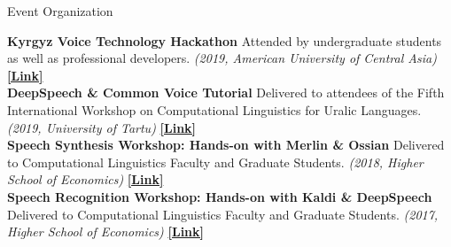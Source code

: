 \documentclass{resume} %
\begin{document}
\begin{minipage}{\textwidth}
\begin{rSection}{Event Organization}
\vspace{.25cm}

{\bf Kyrgyz Voice Technology Hackathon} {Attended by undergraduate students as well as professional developers.} {\em (2019, American University of Central Asia)} \hfill {\href{https://jrmeyer.github.io/kyrgyz-voice-hackathon/}{\textbf{[Link]}}} \\

{\bf DeepSpeech \& Common Voice Tutorial} {Delivered to attendees of the Fifth International Workshop on Computational Linguistics for Uralic Languages.} {\em (2019, University of Tartu)} \hfill { \href{https://sisu.ut.ee/iwclul2019/avaleht}{\textbf{[Link]}}} \\

{\bf Speech Synthesis Workshop: Hands-on with Merlin \& Ossian} {Delivered to Computational Linguistics Faculty and Graduate Students.} {\em (2018, Higher School of Economics)} \hfill {\href{http://jrmeyer.github.io/tts/2016/12/09/tts-workshop.html}{\textbf{[Link]}}} \\

{\bf Speech Recognition Workshop: Hands-on with Kaldi \& DeepSpeech} {Delivered to Computational Linguistics Faculty and Graduate Students.} {\em (2017, Higher School of Economics)} \hfill {\href{http://jrmeyer.github.io/misc/stt-vishka.pdf}{\textbf{[Link]}}}\\

\end{rSection}
\end{minipage}





\end{document}
